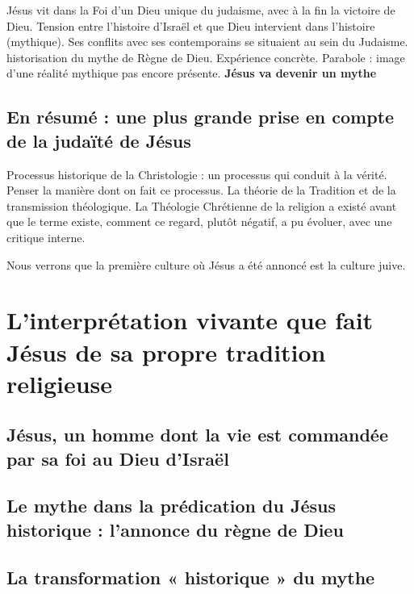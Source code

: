 \begin{Synthesis}
Jésus vit dans la Foi d'un Dieu unique du judaisme, avec à la fin la victoire de Dieu. Tension entre l'histoire d'Israël et que Dieu intervient dans l'histoire (mythique). Ses conflits avec ses contemporains se situaient au sein du Judaisme. 
historisation du mythe de Règne de Dieu. Expérience concrète. Parabole : image d'une réalité mythique pas encore présente. 
\textbf{Jésus va devenir un mythe}
\end{Synthesis}




\subsection{En résumé : une plus grande prise en compte de la judaïté de Jésus}

\begin{Synthesis}
Processus historique de la Christologie : un processus qui conduit à la vérité. Penser la manière dont on fait ce processus. La théorie de la Tradition et de la transmission théologique. 
La Théologie Chrétienne de la religion a existé avant que le terme existe, comment ce regard, plutôt négatif, a pu évoluer, avec une critique interne. 
\end{Synthesis}
Nous verrons que la première culture où Jésus a été annoncé est la culture juive.



 \section{L’interprétation vivante que fait Jésus de sa propre tradition religieuse}
\subsection{Jésus, un homme dont la vie est commandée par sa foi au Dieu d’Israël}
\subsection{Le mythe dans la prédication du Jésus historique : l’annonce du règne de Dieu}
\subsection{La transformation « historique » du mythe}
